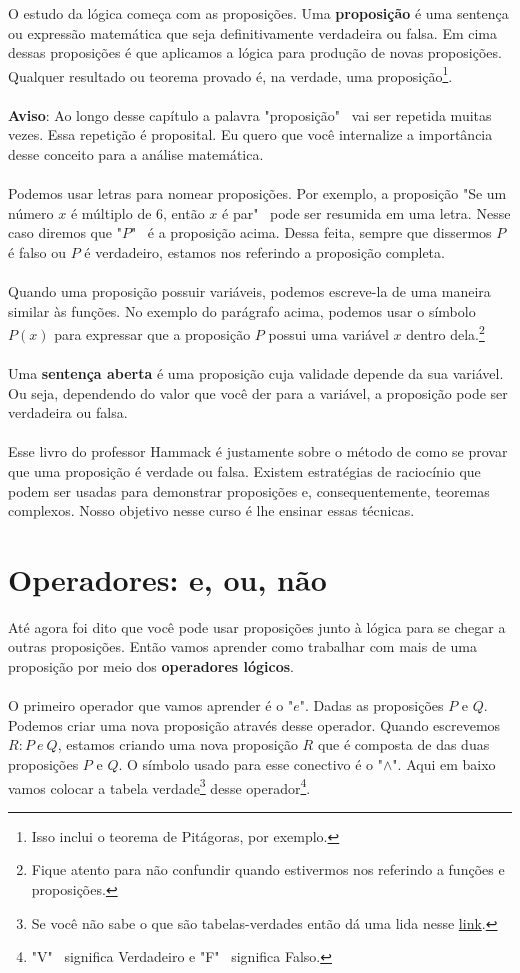 \documentclass[a4paper,11pt]{book}
\theoremstyle{definition}
\theoremstyle{break}
\begin{document}
O estudo da lógica começa com as proposições. Uma \textbf{proposição} é uma sentença ou expressão matemática que seja definitivamente verdadeira ou falsa. Em cima dessas proposições é que aplicamos a lógica para produção de novas proposições. Qualquer resultado ou teorema provado é, na verdade, uma proposição\footnote{Isso inclui o teorema de Pitágoras, por exemplo.}. 
\\
\\
\textbf{Aviso}: Ao longo desse capítulo a palavra "proposição" \ vai ser repetida muitas vezes. Essa repetição é proposital. Eu quero que você internalize a importância desse conceito para a análise matemática.
\\
\\
Podemos usar letras para nomear proposições. Por exemplo, a proposição "Se um número $x$ é múltiplo de 6, então $x$ é par" \  pode ser resumida em uma letra. Nesse caso diremos que "$P$" \ é a proposição acima. Dessa feita, sempre que dissermos $P$ é falso ou $P$ é verdadeiro, estamos nos referindo a proposição completa.
\\
\\
Quando uma proposição possuir variáveis, podemos escreve-la de uma maneira similar às funções. No exemplo do parágrafo acima, podemos usar o símbolo $P(x)$ para expressar que a proposição $P$ possui uma variável $x$ dentro dela.\footnote{Fique atento para não confundir quando estivermos nos referindo a funções e proposições.}
\\
\\
Uma \textbf{sentença aberta} é uma proposição cuja validade depende da sua variável. Ou seja, dependendo do valor que você der para a variável, a proposição pode ser verdadeira ou falsa.
\\
\\
Esse livro do professor Hammack é justamente sobre o método de como se provar que uma proposição é verdade ou falsa. Existem estratégias de raciocínio que podem ser usadas para demonstrar proposições e, consequentemente, teoremas complexos. Nosso objetivo nesse curso é lhe ensinar essas técnicas.

\section{Operadores: e, ou, não}

Até agora foi dito que você pode usar proposições junto à lógica para se chegar a outras proposições. Então vamos aprender como trabalhar com mais de uma proposição por meio dos \textbf{operadores lógicos}.
\\
\\
O primeiro operador que vamos aprender é o "$e$". Dadas as proposições $P$ e $Q$. Podemos criar uma nova proposição através desse operador. Quando escrevemos $R: P \ e \ Q$, estamos criando uma nova proposição $R$ que é composta de das duas proposições $P$ e $Q$. O símbolo usado para esse conectivo é o "$\land$". Aqui em baixo vamos colocar a tabela verdade\footnote{Se você não sabe o que são tabelas-verdades então dá uma lida nesse \href{https://www.youtube.com/watch?v=hWEZsyF3ZZc}{link}.} desse operador\footnote{"V" \ significa Verdadeiro e "F" \  significa Falso.}.
\end{document}
